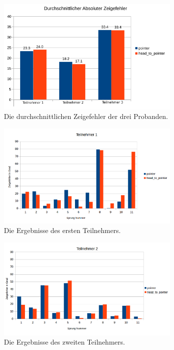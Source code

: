 \begin{figure}[]
  \centering
  \includegraphics[width=0.8\textwidth]{images/average.png}
  \caption{Die durchschnittlichen Zeigefehler der drei Probanden.}
  \label{fig:todo}
\end{figure}

\begin{figure}[]
  \centering
  \includegraphics[width=0.8\textwidth]{images/teilnehmer1.png}
  \caption{Die Ergebnisse des ersten Teilnehmers.}
  \label{fig:todo}
\end{figure}


\begin{figure}[]
  \centering
  \includegraphics[width=0.8\textwidth]{images/teilnehmer2.png}
  \caption{Die Ergebnisse des zweiten Teilnehmers.}
  \label{fig:todo}
\end{figure}


